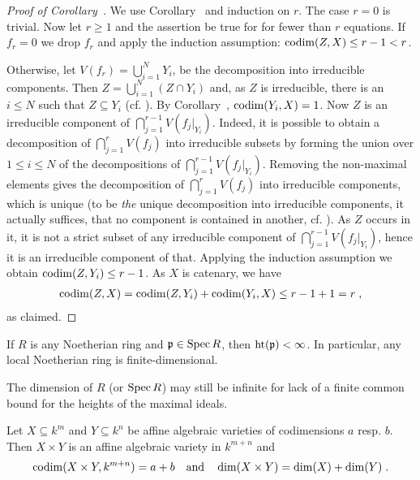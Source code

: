 \documentclass[a4paper,parskip=half,numbers=enddot, DIV=12, headheight=30pt]{scrreprt}
\begin{document}
\begin{proof}[Proof of Corollary~]
    We use Corollary~ and induction on $r$. The case $r=0$ is trivial. Now let $r\geq1$ and the assertion be true for for fewer than $r$ equations. If $f_r=0$ we drop $f_r$ and apply the induction assumption: $\operatorname{codim}(Z,X) \leq r-1< r $. 
    
    Otherwise, let $V(f_r) = \bigcup_{i=1}^N Y_i$, be the decomposition into irreducible components. Then $Z=\bigcup_{i=1}^N (Z\cap Y_i)$ and, as $Z$ is irreducible, there is an $i\leq N$ such that $Z\subseteq Y_i$ (cf. \cite[Proposition~2.1.1]{alg1}). By Corollary~, $\operatorname{codim}(Y_i,X) = 1$. Now $Z$ is an irreducible component of $ \bigcap_{j=1}^{r-1} V(f_j|_{Y_i})$. Indeed, it is possible to obtain a decomposition of $\bigcap_{j=1}^r V(f_j)$ into irreducible subsets by forming the union over $1\leq i\leq N$ of the decompositions of $ \bigcap_{j=1}^{r-1} V(f_j|_{Y_i})$. Removing the non-maximal elements gives the decomposition of $\bigcap_{j=1}^r V(f_j)$ into irreducible components, which is unique (to be \emph{the} unique decomposition into irreducible components, it actually suffices, that no component is contained in another, cf. \cite[Proposition~2.1.1]{alg1}). As $Z$ occurs in it, it is not a strict subset of any irreducible component of $\bigcap_{j=1}^{r-1} V(f_j|_{Y_i})$, hence it is an irreducible component of that. Applying the induction assumption we obtain $\operatorname{codim}(Z,Y_i)\leq r-1$. As $X$ is catenary, we have
    \begin{align*}
        \operatorname{codim}(Z,X) = \operatorname{codim}(Z,Y_i) +\operatorname{codim}(Y_i, X) \leq r-1+1 = r\;,
    \end{align*}
    as claimed.
\end{proof}
\begin{cor}
    If $R$ is any Noetherian ring and $\mathfrak{p}\in\operatorname{Spec} R$, then $\operatorname{ht}(\mathfrak{p}) < \infty$. In particular, any local Noetherian ring is finite-dimensional.
\end{cor}
\begin{rem*}
    The dimension of $R$ (or $\operatorname{Spec} R$) may still be infinite for lack of a finite common bound for the heights of the maximal ideals.
\end{rem*}
\begin{prop}
    Let $X\subseteq k^m$ and $Y\subseteq k^n$ be affine algebraic varieties of codimensions $a$ resp. $b$. Then $X\times Y$ is an affine algebraic variety in $k^{m+n}$ and
    \begin{align*}
    	\operatorname{codim}(X\times Y, k^{m+n})=a+b\quad\text{and}\quad\dim(X\times Y)=\dim (X)+\dim (Y)\;.
    \end{align*}
\end{prop}
\end{document}
